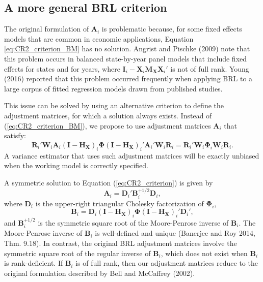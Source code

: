 \documentclass[12pt]{article}
\begin{document}
\hypertarget{a-more-general-brl-criterion}{%
\subsection{A more general BRL
criterion}\label{a-more-general-brl-criterion}}

The original formulation of \(\mathbf{A}_i\) is problematic because, for
some fixed effects models that are common in economic applications,
Equation \ref{eq:CR2_criterion_BM} has no solution. Angrist and Pischke
(2009) note that this problem occurs in balanced state-by-year panel
models that include fixed effects for states and for years, where
\(\mathbf{I}_i - \mathbf{X}_i \mathbf{M_{X}} \mathbf{X}_i'\) is not of
full rank. Young (2016) reported that this problem occurred frequently
when applying BRL to a large corpus of fitted regression models drawn
from published studies.

This issue can be solved by using an alternative criterion to define the
adjustment matrices, for which a solution always exists. Instead of
(\ref{eq:CR2_criterion_BM}), we propose to use adjustment matrices
\(\mathbf{A}_i\) that satisfy: \begin{equation}
\label{eq:CR2_criterion}
\mathbf{\ddot{R}}_i' \mathbf{W}_i \mathbf{A}_i \left(\mathbf{I} - \mathbf{H_X}\right)_i \boldsymbol\Phi \left(\mathbf{I} - \mathbf{H_X}\right)_i' \mathbf{A}_i' \mathbf{W}_i \mathbf{\ddot{R}}_i = \mathbf{\ddot{R}}_i' \mathbf{W}_i \boldsymbol\Phi_i \mathbf{W}_i \mathbf{\ddot{R}}_i.
\end{equation} A variance estimator that uses such adjustment matrices
will be exactly unbiased when the working model is correctly specified.

A symmetric solution to Equation (\ref{eq:CR2_criterion}) is given by
\begin{equation}
\label{eq:CR2_adjustment}
\mathbf{A}_i = \mathbf{D}_i' \mathbf{B}_i^{+1/2} \mathbf{D}_i,
\end{equation} where \(\mathbf{D}_i\) is the upper-right triangular
Cholesky factorization of \(\boldsymbol\Phi_i\), \begin{equation}
\label{eq:CR2_Bmatrix}
\mathbf{B}_i = \mathbf{D}_i\left(\mathbf{I} - \mathbf{H_X}\right)_i \boldsymbol\Phi \left(\mathbf{I} - \mathbf{H_X}\right)_i' \mathbf{D}_i',
\end{equation} and \(\mathbf{B}_i^{+1/2}\) is the symmetric square root
of the Moore-Penrose inverse of \(\mathbf{B}_i\). The Moore-Penrose
inverse of \(\mathbf{B}_i\) is well-defined and unique (Banerjee and Roy
2014, Thm. 9.18). In contrast, the original BRL adjustment matrices
involve the symmetric square root of the regular inverse of
\(\mathbf{B}_i\), which does not exist when \(\mathbf{B}_i\) is
rank-deficient. If \(\mathbf{B}_i\) is of full rank, then our adjustment
matrices reduce to the original formulation described by Bell and
McCaffrey (2002).
\end{document}
